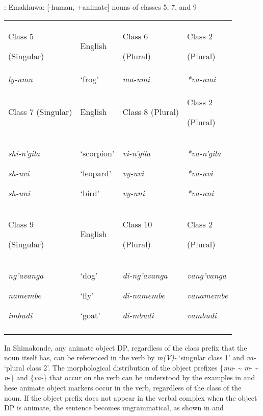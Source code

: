 \documentclass[output=paper]{langsci/langscibook}
\begin{document}
\begin{table}

{\textmd{: }}Emakhuwa: [-human, +animate] nouns of classes 5, 7, and 9


\begin{tabularx}{\textwidth}{XXXX}
\lsptoprule

 Class 5

 (Singular)& English& Class 6

 (Plural)& Class 2

 (Plural)\\
 \textit{ly-umu}& ‘frog’& \textit{ma-umi}& \textit{*va-umi}\\
 Class 7 (Singular)& English& Class 8 (Plural)& Class 2

 (Plural)\\
 \textit{shi-n’gila}

 \textit{sh-uvi}

 \textit{sh-uni}& ‘scorpion’

 ‘leopard’

 ‘bird’& \textit{vi-n’gila}

 \textit{vy-uvi}

 \textit{vy-uni}& \textit{*va-n’gila}

 \textit{*va-uvi}

 \textit{*va-uni}\\
{\mdseries Class 9}

{\mdseries (Singular)} & {\mdseries English} & {\mdseries Class 10}

{\mdseries (Plural)} & {\mdseries Class 2}

{\mdseries (Plural)}\\
 \textit{ng’avanga}

 \textit{namembe}

 \textit{imbudi}& ‘dog’

 ‘fly’

 ‘goat’& \textit{di-ng’avanga}

 \textit{di-namembe}

 \textit{di-mbudi}& \textit{vang’vanga}

 \textit{vanamembe}

 \textit{vambudi}\\
\lspbottomrule
\end{tabularx}

\end{table}

{In Shimakonde, any animate object DP, regardless of the class prefix that the noun itself has, can be referenced in the verb by }{\textit{m(V)- }}{‘singular class 1’ and }{\textit{va-}} {‘plural class 2’. }{The morphological distribution of the object prefixes }{\{}{\textit{mu}}{{}- {\textasciitilde} }{\textit{m}}{{}- {\textasciitilde} }{\textit{n}}{{}-\} and \{}{\textit{va-}}{\} that occur on the verb }{can be understood by the examples in } {and }hese animate object markers occur in the verb, regardless of the class of the noun. {If the object prefix does not appear in the verbal complex when the object DP is animate, the sentence becomes ungrammatical, as shown in } {and }
\end{document}
